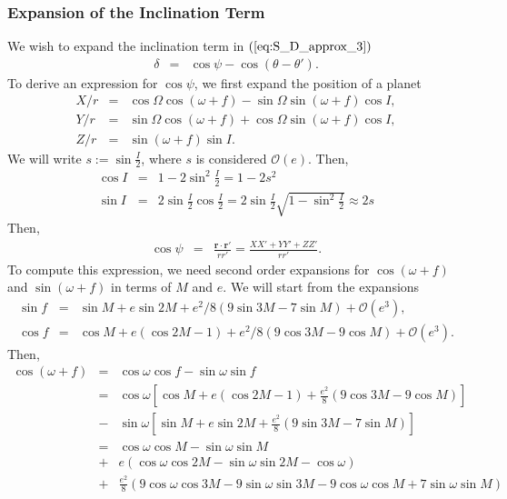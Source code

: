 \documentclass [12pt, a4paper] {article}
\newcommand{\vc}[1]
{
	\boldsymbol{#1}
}
\begin{document}
\subsubsection{Expansion of the Inclination Term}
We wish to expand the inclination term in $(\ref{eq:S_D_approx_3})$
\begin {eqnarray}
    \delta &=& \cos\psi - \cos(\theta - \theta').
\end {eqnarray}
To derive an expression for $\cos\psi$, we first expand the position of a planet 
\begin {eqnarray}
    X/r
    &=& 
    \cos\Omega\cos(\omega + f) - \sin\Omega\sin(\omega + f)\cos I,
    \\
    Y/r
    &=& 
    \sin\Omega\cos(\omega + f) + \cos\Omega\sin(\omega + f)\cos I,
    \\
    Z/r 
    &=&
    \sin(\omega + f)\sin I. 
\end {eqnarray}
We will write $s := \sin\frac{I}{2}$, where $s$ is considered $\mathcal{O}(e)$. 
Then,
\begin {eqnarray}
    \cos I &=& 1 - 2\sin^2\frac{I}{2} = 1 - 2s^2 \\
    \sin I &=& 
    2\sin\frac{I}{2}\cos\frac{I}{2} 
    = 
    2\sin\frac{I}{2}\sqrt{1 - \sin^2\frac{I}{2}}
    \approx 2s
\end {eqnarray}
Then, 
\begin {eqnarray}
    \cos\psi 
    &=& 
    \frac{\vc r\cdot\vc r'}{rr'} 
    =
    \frac{XX' + YY' + ZZ'}{rr'}.
\end {eqnarray}
To compute this expression, we need second order expansions for $\cos(\omega + f)$ and 
$\sin(\omega + f)$ in terms of $M$ and $e$. We will start from the expansions
\begin {eqnarray}
    \sin f 
    &=& 
    \sin M + e\sin 2M + e^2/8(9\sin 3M - 7\sin M) + \mathcal{O}(e^3), 
    \\
    \cos f 
    &=& 
    \cos M + e(\cos 2M - 1) + e^2/8(9\cos 3M - 9 \cos M) + \mathcal{O}(e^3).
\end {eqnarray}
Then, 
\begin {eqnarray}
    \cos(\omega + f) 
    &=&
    \cos\omega\cos f - \sin\omega\sin f
    \\
    &=& 
    \cos\omega[\cos M + e(\cos 2M - 1) + \frac{e^2}{8}(9\cos 3M - 9 \cos M)] 
    \\\nonumber 
    &-&
    \sin\omega[\sin M + e\sin 2M + \frac{e^2}{8}(9\sin 3M - 7\sin M)]
    \\
    &=&
    \cos\omega\cos M - \sin\omega\sin M 
    \\\nonumber 
    &+&
    e(\cos\omega\cos 2M - \sin\omega\sin 2M - \cos\omega)
    \\\nonumber 
    &+&
    \frac{e^2}{8}
    (9\cos\omega\cos 3M - 9\sin\omega\sin 3M - 9 \cos\omega\cos M + 7\sin\omega\sin M)
\end {eqnarray}
\end{document}
